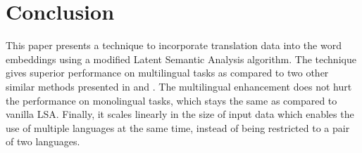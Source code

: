 \documentclass[11pt]{article}
\begin{document}
\section{Conclusion}
This paper presents a technique to incorporate translation data into the word embeddings using a modified Latent Semantic Analysis algorithm. The technique gives superior performance on multilingual tasks as compared to two other similar methods presented in \cite{faruqui2014improving} and \cite{guo2015cross}.  The multilingual enhancement does not hurt the performance on monolingual tasks, which stays the same as compared to vanilla LSA. Finally, it scales linearly in the size of input data which enables the use of multiple languages at the same time, instead of being restricted to a pair of two languages.




\end{document}

